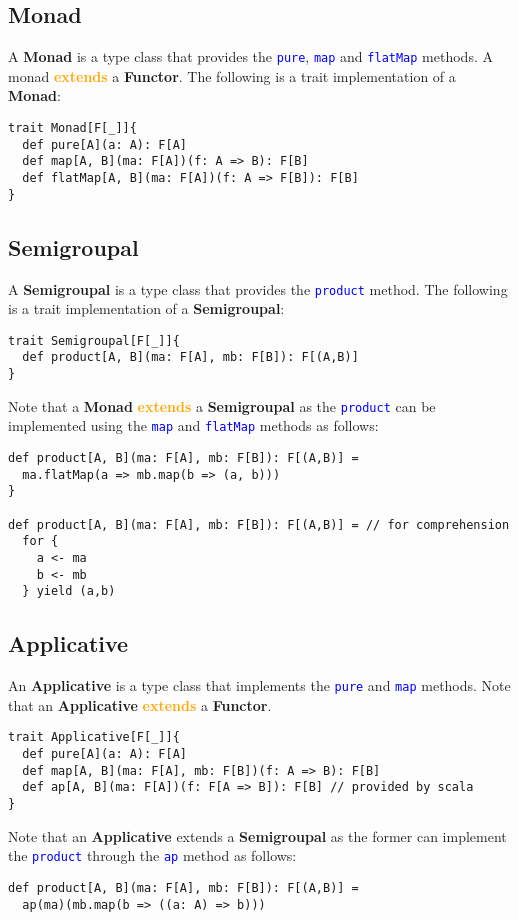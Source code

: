 \documentclass[11pt]{article}
\newcommand\func[1]{\textcolor{blue}{\texttt{#1}}}
\begin{document}
\subsection{Monad}
A \textbf{Monad} is a type class that provides the \func{pure}, \func{map} and \func{flatMap} methods. 
A monad \textcolor{orange}{\textbf{extends}} a \textbf{Functor}. The following is a trait implementation 
of a \textbf{Monad}: 
\begin{lstlisting}[style=myScalastyle]
trait Monad[F[_]]{
  def pure[A](a: A): F[A]
  def map[A, B](ma: F[A])(f: A => B): F[B]
  def flatMap[A, B](ma: F[A])(f: A => F[B]): F[B]
}
\end{lstlisting}

\subsection{Semigroupal}
A \textbf{Semigroupal} is a type class that provides the \func{product} method. The following is a trait implementation 
of a \textbf{Semigroupal}: 
\begin{lstlisting}[style=myScalastyle]
trait Semigroupal[F[_]]{ 
  def product[A, B](ma: F[A], mb: F[B]): F[(A,B)]
}
\end{lstlisting}
Note that a \textbf{Monad} \textcolor{orange}{\textbf{extends}} a \textbf{Semigroupal} as the \func{product} can be implemented 
using the \func{map} and \func{flatMap} methods as follows:
\begin{lstlisting}[style=myScalastyle]
def product[A, B](ma: F[A], mb: F[B]): F[(A,B)] = 
  ma.flatMap(a => mb.map(b => (a, b)))
}

def product[A, B](ma: F[A], mb: F[B]): F[(A,B)] = // for comprehension
  for {
    a <- ma 
    b <- mb 
  } yield (a,b)
\end{lstlisting}

\subsection{Applicative}
An \textbf{Applicative} is a type class that implements the \func{pure} and \func{map} methods.
Note that an \textbf{Applicative} \textcolor{orange}{\textbf{extends}} a \textbf{Functor}.
\begin{lstlisting}[style=myScalastyle]
trait Applicative[F[_]]{
  def pure[A](a: A): F[A]
  def map[A, B](ma: F[A], mb: F[B])(f: A => B): F[B]
  def ap[A, B](ma: F[A])(f: F[A => B]): F[B] // provided by scala
}
\end{lstlisting}
Note that an \textbf{Applicative} extends a \textbf{Semigroupal} as the former can implement 
the \func{product} through the \func{ap} method as follows: 
\begin{lstlisting}[style=myScalastyle]
def product[A, B](ma: F[A], mb: F[B]): F[(A,B)] = 
  ap(ma)(mb.map(b => ((a: A) => b)))
\end{lstlisting}
\end{document}
